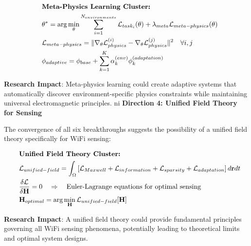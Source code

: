 \documentclass[journal]{IEEEtran}
\begin{document}
\begin{align}
&\hspace{2em} \text{\textbf{Meta-Physics Learning Cluster:}} \quad &  \nonumber \\
&\hspace{2em} \theta^* = \arg\min_{\theta} \sum_{i=1}^{N_{environments}} \mathcal{L}_{task_i}(\theta) + \lambda_{meta} \mathcal{L}_{meta-physics}(\theta) \label{eq:meta_physics_optimization} \\
&\hspace{2em} \mathcal{L}_{meta-physics} = \|\nabla_{\theta} \mathcal{L}_{physics}^{(i)} - \nabla_{\theta} \mathcal{L}_{physics}^{(j)}\|^2 \quad \forall i,j \label{eq:physics_consistency} \\
&\hspace{2em} \phi_{adaptive} = \phi_{base} + \sum_{k=1}^{K} \alpha_k^{(env)} \phi_k^{(adaptation)} \label{eq:adaptive_physics}
\end{align}

\textbf{Research Impact}: Meta-physics learning could create adaptive systems that automatically discover environment-specific physics constraints while maintaining universal electromagnetic principles.
ni
\textbf{Direction 4: Unified Field Theory for Sensing}

The convergence of all six breakthroughs suggests the possibility of a unified field theory specifically for WiFi sensing:

\begin{align}
&\hspace{2em} \text{\textbf{Unified Field Theory Cluster:}} \quad &  \nonumber \\
&\hspace{2em} \mathcal{L}_{unified-field} = \int_{\Omega} \left[ \mathcal{L}_{Maxwell} + \mathcal{L}_{information} + \mathcal{L}_{sparsity} + \mathcal{L}_{adaptation} \right] d\mathbf{r}dt \label{eq:unified_field_lagrangian} \\
&\hspace{2em} \frac{\delta \mathcal{L}}{\delta \mathbf{H}} = 0 \quad \Rightarrow \quad \text{Euler-Lagrange equations for optimal sensing} \label{eq:sensing_euler_lagrange} \\
&\hspace{2em} \mathbf{H}_{optimal} = \arg\min_{\mathbf{H}} \mathcal{L}_{unified-field}[\mathbf{H}] \label{eq:optimal_sensing_field}
\end{align}

\textbf{Research Impact}: A unified field theory could provide fundamental principles governing all WiFi sensing phenomena, potentially leading to theoretical limits and optimal system designs.
\end{document}
